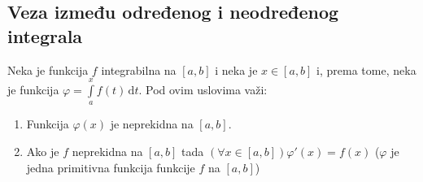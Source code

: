 \subsection{Veza između određenog i neodređenog integrala}
\begin{theorem}
	Neka je funkcija $f$ integrabilna na $[a,b]$ i neka je $x\in [a,b]$ i, prema tome, neka je funkcija $\varphi = \int \limits^x_a f(t) \, \mathrm{d}t$. Pod ovim uslovima važi:
	\begin{enumerate}[label = \arabic*)]
		\item
			Funkcija $\varphi(x)$ je neprekidna na $[a,b]$.
		\item
			Ako je $f$ neprekidna na $[a,b]$ tada $(\forall x \in [a,b]) \varphi'(x) = f(x)$ ($\varphi$ je jedna primitivna funkcija funkcije $f$ na $[a,b]$)
	\end{enumerate}
\end{theorem}

